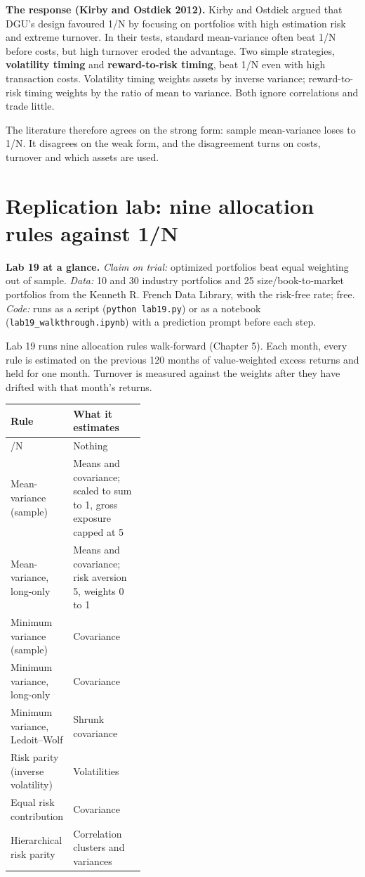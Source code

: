 \textbf{The response (Kirby and Ostdiek 2012).} Kirby and Ostdiek argued that DGU's design favoured 1/N by focusing on portfolios with high estimation risk and extreme turnover. In their tests, standard mean-variance often beat 1/N before costs, but high turnover eroded the advantage. Two simple strategies, \textbf{volatility timing} and \textbf{reward-to-risk timing}, beat 1/N even with high transaction costs. Volatility timing weights assets by inverse variance; reward-to-risk timing weights by the ratio of mean to variance. Both ignore correlations and trade little.

The literature therefore agrees on the strong form: sample mean-variance loses to 1/N. It disagrees on the weak form, and the disagreement turns on costs, turnover and which assets are used.

\section{Replication lab: nine allocation rules against 1/N}
\label{sec:19-lab}

\begin{callout}
\textbf{Lab 19 at a glance.} \emph{Claim on trial:} optimized portfolios beat equal weighting out of sample. \emph{Data:} 10 and 30 industry portfolios and 25 size/book-to-market portfolios from the Kenneth R. French Data Library, with the risk-free rate; free. \emph{Code:} runs as a script (\texttt{python lab19.py}) or as a notebook (\texttt{lab19\_walkthrough.ipynb}) with a prediction prompt before each step.
\end{callout}

Lab 19 runs nine allocation rules walk-forward (Chapter 5). Each month, every rule is estimated on the previous 120 months of value-weighted excess returns and held for one month. Turnover is measured against the weights after they have drifted with that month's returns.

\begin{center}
\small
\begin{tabularx}{0.9\linewidth}{@{}>{\raggedright\arraybackslash}p{0.38\linewidth}>{\raggedright\arraybackslash}X@{}}
\toprule
Rule & What it estimates \\
\midrule
1/N & Nothing \\
Mean-variance (sample) & Means and covariance; scaled to sum to 1, gross exposure capped at 5 \\
Mean-variance, long-only & Means and covariance; risk aversion 5, weights 0 to 1 \\
Minimum variance (sample) & Covariance \\
Minimum variance, long-only & Covariance \\
Minimum variance, Ledoit--Wolf & Shrunk covariance \\
Risk parity (inverse volatility) & Volatilities \\
Equal risk contribution & Covariance \\
Hierarchical risk parity & Correlation clusters and variances \\
\bottomrule
\end{tabularx}
\end{center}

